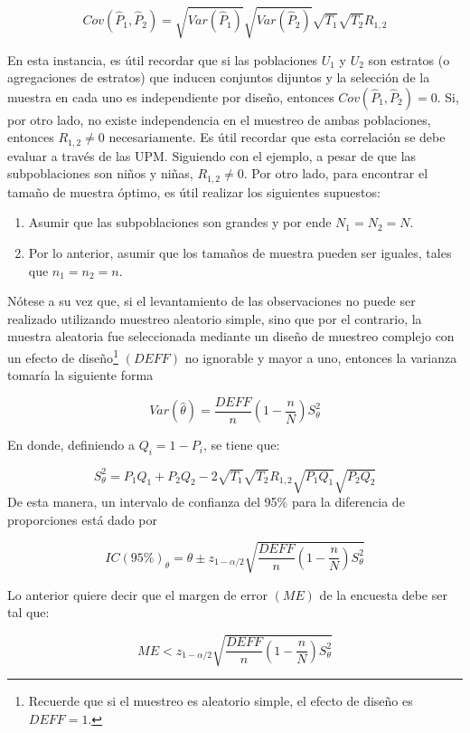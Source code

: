 \documentclass[
  12pt,
  spanish,
]{book}
\providecommand{\tightlist}{%
  \setlength{\itemsep}{0pt}\setlength{\parskip}{0pt}}
\begin{document}
\[
Cov(\hat{P}_1, \hat{P}_2) = \sqrt{Var(\hat{P}_1)}\sqrt{Var(\hat{P}_2)}\sqrt{T_1}\sqrt{T_2}R_{1,2}
\]

En esta instancia, es útil recordar que si las poblaciones \(U_1\) y \(U_2\) son estratos (o agregaciones de estratos) que inducen conjuntos dijuntos y la selección de la muestra en cada uno es independiente por diseño, entonces \(Cov(\hat{P}_1, \hat{P}_2) = 0\). Si, por otro lado, no existe independencia en el muestreo de ambas poblaciones, entonces \(R_{1,2} \neq 0\) necesariamente. Es útil recordar que esta correlación se debe evaluar a través de las UPM. Siguiendo con el ejemplo, a pesar de que las subpoblaciones son niños y niñas, \(R_{1,2} \neq 0\). Por otro lado, para encontrar el tamaño de muestra óptimo, es útil realizar los siguientes supuestos:

\begin{enumerate}
\def\labelenumi{\arabic{enumi}.}
\tightlist
\item
  Asumir que las subpoblaciones son grandes y por ende \(N_1=N_2=N\).
\item
  Por lo anterior, asumir que los tamaños de muestra pueden ser iguales, tales que \(n_1=n_2=n\).
\end{enumerate}

Nótese a su vez que, si el levantamiento de las observaciones no puede ser realizado utilizando muestreo aleatorio simple, sino que por el contrario, la muestra aleatoria fue seleccionada mediante un diseño de muestreo complejo con un efecto de diseño\footnote{Recuerde que si el muestreo es aleatorio simple, el efecto de diseño es \(DEFF=1\).} \((DEFF)\) no ignorable y mayor a uno, entonces la varianza tomaría la siguiente forma

\[
Var(\hat{\theta})=\frac{DEFF}{n}\left(1-\frac{n}{N}\right)S^2_{\theta}
\]

En donde, definiendo a \(Q_i = 1-P_i\), se tiene que:

\[
S^2_{\theta} = P_1Q_1+P_2Q_2 - 2 \sqrt{T_1}\sqrt{T_2}R_{1,2} \sqrt{P_1Q_1}\sqrt{P_2Q_2}
\]
De esta manera, un intervalo de confianza del 95\% para la diferencia de proporciones está dado por

\[
IC(95\%)_{\theta}=\hat{\theta} \pm z_{1-\alpha/2} \sqrt{\frac{DEFF}{n}\left(1-\frac{n}{N}\right)S^2_{\theta}}
\]

Lo anterior quiere decir que el margen de error \((ME)\) de la encuesta debe ser tal que:

\[
ME < z_{1-\alpha/2} \sqrt{\frac{DEFF}{n}\left(1-\frac{n}{N}\right)S^2_{\theta}}
\]
\end{document}
